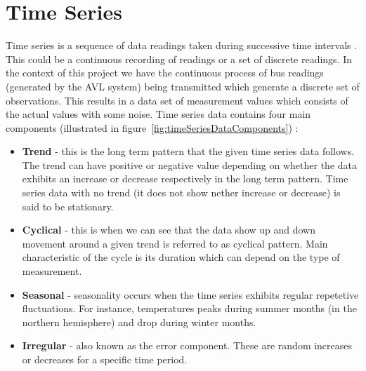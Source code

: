 \section{Time Series}
Time series is a sequence of data readings taken during successive time intervals \cite{shumway2010time}. This could be a continuous recording of readings or a set of discrete readings. In the context of this project we have the continuous process of bus readings (generated by the AVL system) being transmitted which generate a discrete set of observations. This results in a data set of measurement values which consists of the actual values with some noise. Time series data contains four main components (illustrated in figure~\ref{fig:timeSeriesDataComponents}) \cite{brockwell2002introduction}:
\begin{itemize}
	\item \textbf{Trend} - this is the long term pattern that the given time series data follows. The trend can have positive or negative value depending on whether the data exhibits an increase or decrease respectively in the long term pattern. Time series data with no trend (it does not show nether increase or decrease) is said to be stationary.
	\item \textbf{Cyclical} - this is when we can see that the data show up and down movement around a given trend is referred to as cyclical pattern. Main characteristic of the cycle is its duration which can depend on the type of measurement.
	\item \textbf{Seasonal} - seasonality occurs when the time series exhibits regular repetetive fluctuations. For instance, temperatures peaks during summer months (in the northern hemisphere) and drop during winter months.
	\item \textbf{Irregular} - also known as the error component. These are random increases or decreases for a specific time period.
\end{itemize}

